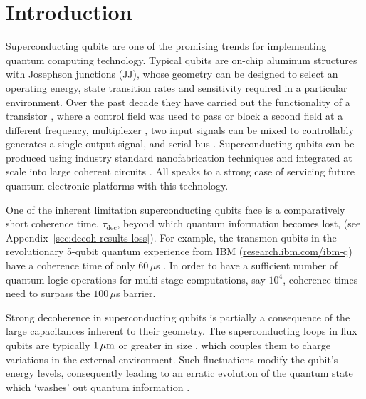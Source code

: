 
\section{Introduction}

\noindent Superconducting  qubits are  one of  the promising  trends for  implementing quantum
computing technology. Typical qubits are  on-chip aluminum structures with Josephson junctions
(JJ), whose geometry can be designed to select an operating energy, state transition rates and
sensitivity required in a particular environment.  Over  the past decade they have carried out
the functionality of a transistor \cite{Astafiev2010, hoi2011}, where a control field was used
to pass or block  a second field at a different  frequency, multiplexer \cite{honigl2018}, two
input signals can  be mixed to controllably  generates a single output signal,  and serial bus
\cite{shen2005}.    Superconducting   qubits  can   be   produced   using  industry   standard
nanofabrication   techniques  and   integrated   at  scale   into   large  coherent   circuits
\cite{johnson2010}.   All speaks  to  a strong  case of  servicing  future quantum  electronic
platforms with this technology.

One of the inherent limitation superconducting  qubits face is a comparatively short coherence
time,   $\tau_{\text{dec}}$,    beyond   which    quantum   information   becomes    lost,   (see
Appendix~\ref{sec:decoh-results-loss}).  For example, the transmon qubits in the revolutionary
5-qubit                quantum                experience               from                IBM
(\href{http://www.research.ibm.com/ibm-q}{research.ibm.com/ibm-q})  have a  coherence time  of
only $  60\,\mu $s  \cite{linke2017}.  In  order to have  a sufficient  number of  quantum logic
operations for  multi-stage computations, say  $ 10^4 $, coherence  times need to  surpass the
$ 100\,\mu$s barrier.

Strong  decoherence  in  superconducting  qubits  is partially  a  consequence  of  the  large
capacitances  inherent to  their  geometry.   The superconducting  loops  in  flux qubits  are
typically  $  1\,\mu\text{m}$ or  greater  in  size \cite{hoi2011,  johnson2010},  which
couples them to  charge variations in the external environment.   Such fluctuations modify the
qubit's energy levels, consequently leading to an erratic evolution of the quantum state which
`washes' out quantum information \cite{devoret2008}.
 
